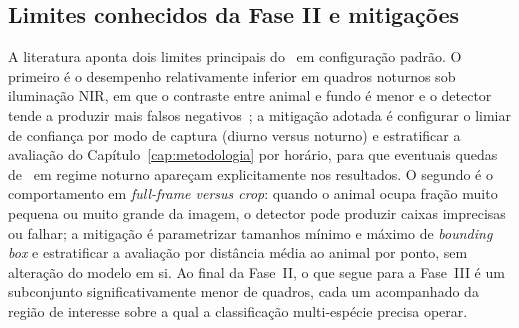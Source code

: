\subsection*{Limites conhecidos da Fase II e mitigações}

A literatura aponta dois limites principais do \modeloMD~em configuração padrão. O primeiro é o desempenho relativamente inferior em quadros noturnos sob iluminação NIR, em que o contraste entre animal e fundo é menor e o detector tende a produzir mais falsos negativos~\cite{velasco2024smartcameratraps,mulero2025addressing}; a mitigação adotada é configurar o limiar de confiança por modo de captura (diurno versus noturno) e estratificar a avaliação do Capítulo~\ref{cap:metodologia} por horário, para que eventuais quedas de \mAP~em regime noturno apareçam explicitamente nos resultados. O segundo é o comportamento em \emph{full-frame versus crop}: quando o animal ocupa fração muito pequena ou muito grande da imagem, o detector pode produzir caixas imprecisas ou falhar; a mitigação é parametrizar tamanhos mínimo e máximo de \emph{bounding box} e estratificar a avaliação por distância média ao animal por ponto, sem alteração do modelo em si. Ao final da Fase~II, o que segue para a Fase~III é um subconjunto significativamente menor de quadros, cada um acompanhado da região de interesse sobre a qual a classificação multi-espécie precisa operar.
